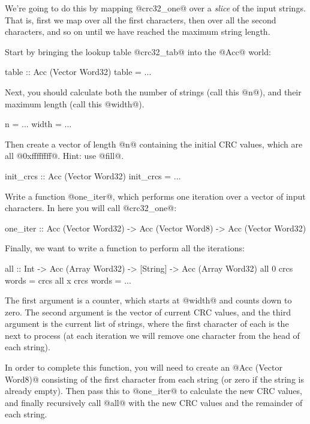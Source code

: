 \documentclass[11pt,a4paper]{article}
\begin{document}
We're going to do this by mapping @crc32_one@ over a \emph{slice} of
the input strings.  That is, first we map over all the first
characters, then over all the second characters, and so on until we
have reached the maximum string length.

Start by bringing the lookup table @crc32_tab@ into the @Acc@ world:

\begin{haskell}
    table :: Acc (Vector Word32)
    table = ...
\end{haskell}

Next, you should calculate both the number of strings (call this @n@),
and their maximum length (call this @width@).

\begin{haskell}
    n = ...
    width = ...
\end{haskell}

Then create a vector of length @n@ containing the initial CRC values,
which are all @0xffffffff@.  Hint: use @fill@.

\begin{haskell}
    init_crcs :: Acc (Vector Word32)
    init_crcs = ...
\end{haskell}

Write a function @one_iter@, which performs one iteration over a
vector of input characters.  In here you will call @crc32_one@:

\begin{haskell}
    one_iter :: Acc (Vector Word32) -> Acc (Vector Word8)
             -> Acc (Vector Word32)
\end{haskell}

Finally, we want to write a function to perform all the iterations:

\begin{haskell}
    all :: Int -> Acc (Array Word32) -> [String]
        -> Acc (Array Word32)
    all 0 crcs words = crcs
    all x crcs words = ...
\end{haskell}

The first argument is a counter, which starts at @width@ and counts
down to zero.  The second argument is the vector of current CRC
values, and the third argument is the current list of strings, where
the first character of each is the next to process (at each iteration
we will remove one character from the head of each string).

In order to complete this function, you will need to create an
@Acc (Vector Word8)@ consisting of the first character from each
string (or zero if the string is already empty).  Then pass this to
@one_iter@ to calculate the new CRC values, and finally recursively
call @all@ with the new CRC values and the remainder of each string.
\end{document}
